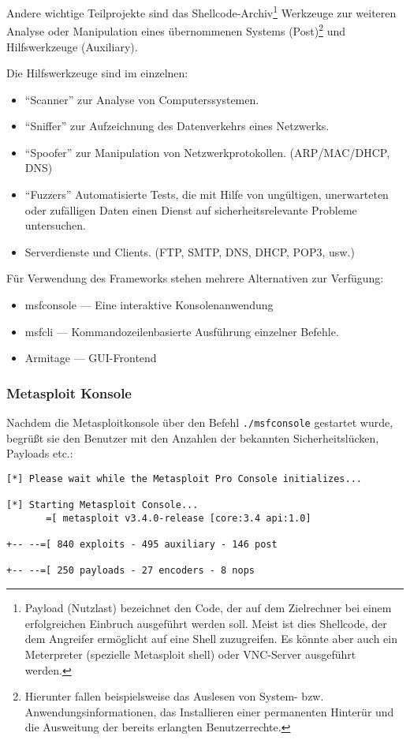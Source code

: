 Andere wichtige Teilprojekte sind das Shellcode-Archiv\footnote{Payload
  (Nutzlast) bezeichnet den Code, der auf dem Zielrechner bei einem
  erfolgreichen Einbruch ausgeführt werden soll. Meist ist dies Shellcode, der
  dem Angreifer ermöglicht auf eine Shell zuzugreifen. Es könnte aber auch ein
  Meterpreter (spezielle Metasploit shell) oder VNC-Server ausgeführt werden.}
Werkzeuge zur weiteren Analyse oder Manipulation eines übernommenen Systems
(Post)\footnote{Hierunter fallen beispielsweise das Auslesen von System-
  bzw. Anwendungsinformationen, das Installieren einer permanenten Hinterür und
  die Ausweitung der bereits erlangten Benutzerrechte.} und Hilfswerkzeuge
(Auxiliary).

Die Hilfswerkzeuge sind im einzelnen:

\begin{itemize}
  \item ``Scanner'' zur Analyse von Computerssystemen.
  \item ``Sniffer'' zur Aufzeichnung des Datenverkehrs eines Netzwerks.
  \item ``Spoofer'' zur Manipulation von Netzwerkprotokollen. (ARP/MAC/DHCP, DNS)
  \item ``Fuzzers'' Automatisierte Tests, die mit Hilfe von ungültigen,
    unerwarteten oder zufälligen Daten einen Dienst auf sicherheitsrelevante
    Probleme untersuchen.
  \item Serverdienste und Clients. (FTP, SMTP, DNS, DHCP, POP3, usw.)
\end{itemize}

Für Verwendung des Frameworks stehen mehrere Alternativen zur Verfügung:

\begin{itemize}
  \item msfconsole --- Eine interaktive Konsolenanwendung
  \item msfcli     --- Kommandozeilenbasierte Ausführung einzelner Befehle.
  \item Armitage   --- GUI-Frontend
\end{itemize}

\subsubsection{Metasploit Konsole}

Nachdem die Metasploitkonsole über den Befehl \lstinline{./msfconsole} gestartet
wurde, begrüßt sie den Benutzer mit den Anzahlen der bekannten
Sicherheitslücken, Payloads etc.:
\begin{lstlisting}[language=Metasploit]
[*] Please wait while the Metasploit Pro Console initializes...

[*] Starting Metasploit Console...
       =[ metasploit v3.4.0-release [core:3.4 api:1.0]

+-- --=[ 840 exploits - 495 auxiliary - 146 post

+-- --=[ 250 payloads - 27 encoders - 8 nops
\end{lstlisting}

